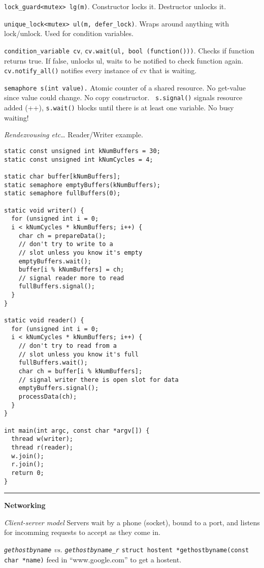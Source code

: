 \documentclass{article}
\begin{document}
\begin{multicols}{2}
  {\tt lock\_guard<mutex> lg(m)}. Constructor locks it. Destructor unlocks it.

  {\tt unique\_lock<mutex> ul(m, defer\_lock)}. Wraps around anything with
  lock/unlock. Used for condition variables.

  {\tt condition\_variable cv}, {\tt cv.wait(ul, bool (function()))}. Checks if
  function returns true. If false, unlocks ul, waits to be notified to check
  function again. {\tt cv.notify\_all()} notifies every instance of cv that is
  waiting.

  {\tt semaphore s(int value).} Atomic counter of a shared resource. No
  get-value since value could change. No copy constructor. {\tt
  s.signal()} signals resource added (++), {\tt s.wait()} blocks until there is
  at least one variable. No busy waiting!

  {\it Rendezvousing etc\ldots} Reader/Writer example.
  \begin{verbatim}
static const unsigned int kNumBuffers = 30;
static const unsigned int kNumCycles = 4;

static char buffer[kNumBuffers];
static semaphore emptyBuffers(kNumBuffers);
static semaphore fullBuffers(0);

static void writer() {
  for (unsigned int i = 0;
  i < kNumCycles * kNumBuffers; i++) {
    char ch = prepareData();
    // don't try to write to a
    // slot unless you know it's empty
    emptyBuffers.wait();
    buffer[i % kNumBuffers] = ch;
    // signal reader more to read
    fullBuffers.signal();
  }
}

static void reader() {
  for (unsigned int i = 0;
  i < kNumCycles * kNumBuffers; i++) {
    // don't try to read from a
    // slot unless you know it's full
    fullBuffers.wait();
    char ch = buffer[i % kNumBuffers];
    // signal writer there is open slot for data
    emptyBuffers.signal();
    processData(ch);
  }
}

int main(int argc, const char *argv[]) {
  thread w(writer);
  thread r(reader);
  w.join();
  r.join();
  return 0;
}
  \end{verbatim}

  \noindent\rule{4cm}{0.4pt}

  {\bf Networking}

  {\it Client-server model} Servers wait by a phone (socket), bound to a port,
  and listens for incomming requests to accept as they come in.

  {\it {\tt gethostbyname} vs. {\tt gethostbyname\_r}}
  {\tt struct hostent *gethostbyname(const char *name)} feed in
  ``www.google.com'' to get a hostent. %


\end{multicols}
\end{document}
